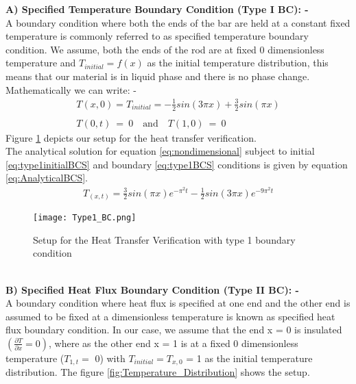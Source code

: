 \noindent \textbf{A) Specified Temperature Boundary Condition (Type I BC): -}\\
 A boundary condition where both the ends of the bar are held at a constant fixed temperature is commonly referred to as specified temperature boundary condition\cite{Cengel_Ghajar_2020}. We assume, both the ends of the rod are at fixed 0 dimensionless temperature and $T_{initial} = f(x)$ as the initial temperature distribution, this means that our material is in liquid phase and there is no phase change. Mathematically we can write: -
 \begin{subequations}
     \begin{align}
         T(x,0) = T_{initial} = -\frac{1}{2}sin(3\pi x)+\frac{3}{2}sin(\pi x) \label{eq:type1initialBCS} \\ \nonumber
         \\
         T(0,t) \ = \ 0 \quad \text{and} \quad T(1,0) \ = \ 0 \label{eq:type1BCS}
     \end{align}
 \end{subequations}
 Figure \ref{fig:Type1_BC} depicts our setup for the heat transfer verification.\\
 The analytical solution for equation \eqref{eq:nondimensional} subject to initial \eqref{eq:type1initialBCS} and boundary \eqref{eq:type1BCS} conditions is given by equation \eqref{eq:AnalyticalBCS}\cite{Hancock}.
 \begin{subequations}
     \begin{align}
         T_{(x,t)} = \frac{3}{2}sin(\pi x)e^{-\pi^2 t}-\frac{1}{2}sin(3\pi x)e^{-9\pi^2 t} \label{eq:AnalyticalBCS}
     \end{align}
 \end{subequations}
 \begin{figure}[htb]
  \centering
  \texttt{[image: Type1\_BC.png]}\\
  \caption{Setup for the Heat Transfer Verification with type 1 boundary condition}
  \label{fig:Type1_BC}
\end{figure}\\
\noindent \textbf{B) Specified Heat Flux Boundary Condition (Type II BC): -}\\
A boundary condition where heat flux is specified at one end and the other end is assumed to be fixed at a dimensionless temperature is known as specified heat flux boundary condition\cite{Cengel_Ghajar_2020}. In our case, we  assume that the end x = 0 is insulated $\left(\frac{\partial T}{\partial x} =  0 \right)$, where as the other end x = 1 is at a fixed 0 dimensionless temperature ($T_{1,t} = $ 0) with $T_{initial} = T_{x,0}$ = 1 as the initial temperature distribution. The figure \ref{fig:Temperature_Distribution} shows the setup.  
